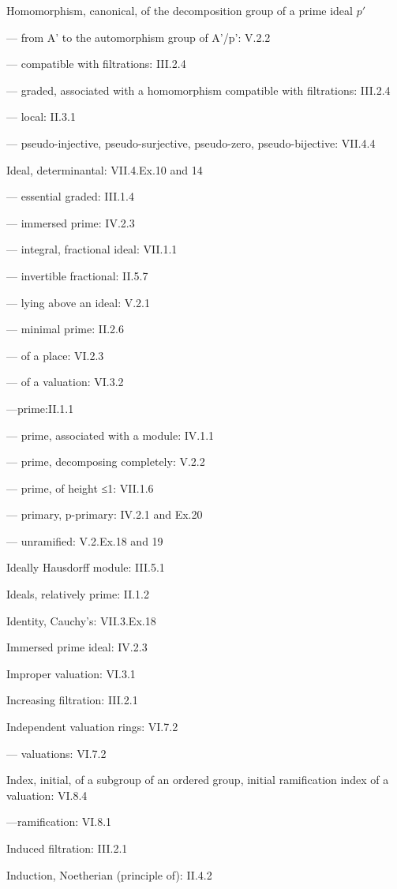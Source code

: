 Homomorphism, canonical, of the decomposition group of a prime ideal \(p'\)

--- from A' to the automorphism group of A'/p': V.2.2

--- compatible with filtrations: III.2.4

--- graded, associated with a homomorphism compatible with filtrations: III.2.4

--- local: II.3.1

--- pseudo-injective, pseudo-surjective, pseudo-zero, pseudo-bijective: VII.4.4

Ideal, determinantal: VII.4.Ex.10 and 14

--- essential graded: III.1.4

--- immersed prime: IV.2.3

--- integral, fractional ideal: VII.1.1

--- invertible fractional: II.5.7

--- lying above an ideal: V.2.1

--- minimal prime: II.2.6

--- of a place: VI.2.3

--- of a valuation: VI.3.2

---prime:II.1.1

--- prime, associated with a module: IV.1.1

--- prime, decomposing completely: V.2.2

--- prime, of height ≤1: VII.1.6

--- primary, p-primary: IV.2.1 and Ex.20

--- unramified: V.2.Ex.18 and 19

Ideally Hausdorff module: III.5.1

Ideals, relatively prime: II.1.2

Identity, Cauchy's: VII.3.Ex.18

Immersed prime ideal: IV.2.3

Improper valuation: VI.3.1

Increasing filtration: III.2.1

Independent valuation rings: VI.7.2

--- valuations: VI.7.2

Index, initial, of a subgroup of an ordered group, initial ramification index of a valuation: VI.8.4

---ramification: VI.8.1

Induced filtration: III.2.1

Induction, Noetherian (principle of): II.4.2

